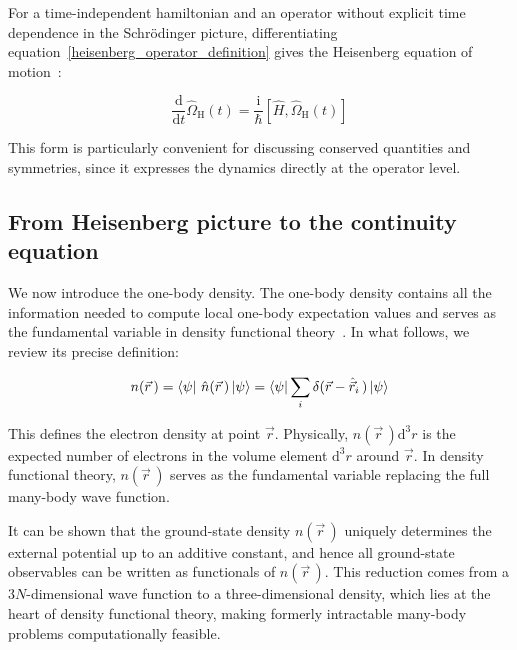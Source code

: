 For a time-independent hamiltonian and an operator without explicit time dependence in the Schrödinger picture, differentiating equation~\eqref{heisenberg_operator_definition} gives the Heisenberg equation of motion~\cite{shankar2012principles}:

\begin{equation}
    \frac{\mathrm{d}}{\mathrm{d}t}\hat{\Omega}_\mathrm{H}(t)
    =\frac{\mathrm{i}}{\hbar}\left[\hat{H},\hat{\Omega}_\mathrm{H}(t)\right]
\label{heisenberg_equation_of_motion}
\end{equation}

This form is particularly convenient for discussing conserved quantities and symmetries, since it expresses the dynamics directly at the operator level.

\subsection{From Heisenberg picture to the continuity equation}

We now introduce the one-body density.
The one-body density contains all the information needed to compute local one-body expectation values and serves as the fundamental variable in density functional theory~\cite{hohenberg1964inhomogeneous,jones2015density,maitra2016perspective}.
In what follows, we review its precise definition:

\begin{equation}
    n(\vec{r}\,)
    = \bra{\psi}\,\hat{n}(\vec{r}\,)\ket{\psi}
    = \bra{\psi}\sum_i\delta(\vec{r} - \hat{\vec{r}}_i\,)\ket{\psi}
\label{particle_density_operator_definition}
\end{equation}

This defines the electron density at point $\vec{r}$.
Physically, $n(\vec{r}\,)\mathrm{d}^3r$ is the expected number of electrons in the volume element $\mathrm{d}^3r$ around $\vec{r}$.
In density functional theory, $n(\vec{r}\,)$ serves as the fundamental variable replacing the full many-body wave function.  

It can be shown that the ground-state density $n(\vec{r}\,)$ uniquely determines the external potential up to an additive constant, and hence all ground-state observables can be written as functionals of $n(\vec{r}\,)$.
This reduction comes from a 3$N$-dimensional wave function to a three-dimensional density, which lies at the heart of density functional theory, making formerly intractable many-body problems computationally feasible.

